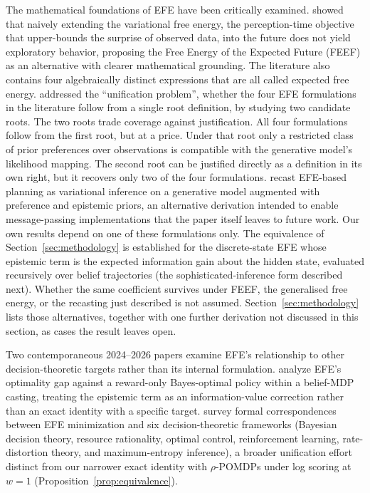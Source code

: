 The mathematical foundations of EFE have been critically examined. \citet{millidge2021} showed that naively extending the variational free energy, the perception-time objective that upper-bounds the surprise of observed data, into the future does not yield exploratory behavior, proposing the Free Energy of the Expected Future (FEEF) as an alternative with clearer mathematical grounding. The literature also contains four algebraically distinct expressions that are all called expected free energy. \citet{champion2024} addressed the ``unification problem'', whether the four EFE formulations in the literature follow from a single root definition, by studying two candidate roots. The two roots trade coverage against justification. All four formulations follow from the first root, but at a price. Under that root only a restricted class of prior preferences over observations is compatible with the generative model's likelihood mapping. The second root can be justified directly as a definition in its own right, but it recovers only two of the four formulations. \citet{devries2025} recast EFE-based planning as variational inference on a generative model augmented with preference and epistemic priors, an alternative derivation intended to enable message-passing implementations that the paper itself leaves to future work. Our own results depend on one of these formulations only. The equivalence of Section~\ref{sec:methodology} is established for the discrete-state EFE whose epistemic term is the expected information gain about the hidden state, evaluated recursively over belief trajectories (the sophisticated-inference form described next). Whether the same coefficient survives under FEEF, the generalised free energy, or the recasting just described is not assumed. Section~\ref{sec:methodology} lists those alternatives, together with one further derivation not discussed in this section, as cases the result leaves open.

Two contemporaneous 2024--2026 papers examine EFE's relationship to other decision-theoretic targets rather than its internal formulation. \citet{wei2024voi} analyze EFE's optimality gap against a reward-only Bayes-optimal policy within a belief-MDP casting, treating the epistemic term as an information-value correction rather than an exact identity with a specific target. \citet{sweeney2026equivalences} survey formal correspondences between EFE minimization and six decision-theoretic frameworks (Bayesian decision theory, resource rationality, optimal control, reinforcement learning, rate-distortion theory, and maximum-entropy inference), a broader unification effort distinct from our narrower exact identity with $\rho$-POMDPs under log scoring at $w{=}1$ (Proposition~\ref{prop:equivalence}).

